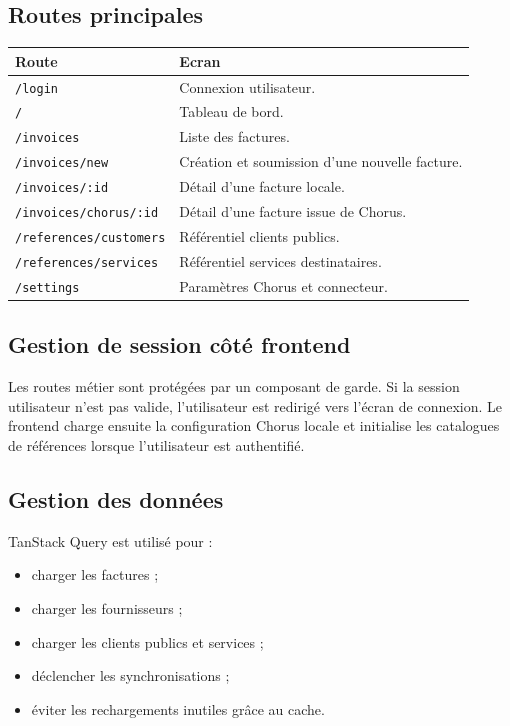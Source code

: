 \documentclass[11pt,a4paper]{article}
\begin{document}
\subsection{Routes principales}

\begin{longtable}{|p{}|p{}|}
  \hline
  \textbf{Route} & \textbf{Ecran} \\
  \hline
  \texttt{/login} &
  Connexion utilisateur. \\
  \hline
  \texttt{/} &
  Tableau de bord. \\
  \hline
  \texttt{/invoices} &
  Liste des factures. \\
  \hline
  \texttt{/invoices/new} &
  Création et soumission d'une nouvelle facture. \\
  \hline
  \texttt{/invoices/:id} &
  Détail d'une facture locale. \\
  \hline
  \texttt{/invoices/chorus/:id} &
  Détail d'une facture issue de Chorus. \\
  \hline
  \texttt{/references/customers} &
  Référentiel clients publics. \\
  \hline
  \texttt{/references/services} &
  Référentiel services destinataires. \\
  \hline
  \texttt{/settings} &
  Paramètres Chorus et connecteur. \\
  \hline
\end{longtable}

\subsection{Gestion de session côté frontend}

Les routes métier sont protégées par un composant de garde. Si la session
utilisateur n'est pas valide, l'utilisateur est redirigé vers l'écran de
connexion. Le frontend charge ensuite la configuration Chorus locale et initialise
les catalogues de références lorsque l'utilisateur est authentifié.

\subsection{Gestion des données}

TanStack Query est utilisé pour :

\begin{itemize}
  \item charger les factures ;
  \item charger les fournisseurs ;
  \item charger les clients publics et services ;
  \item déclencher les synchronisations ;
  \item éviter les rechargements inutiles grâce au cache.
\end{itemize}
\end{document}
